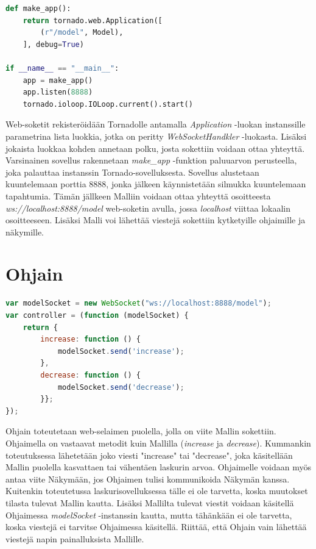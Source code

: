 \documentclass[utf8]{gradu3}
\begin{document}
\begin{lstlisting}[language=Python]
def make_app():
    return tornado.web.Application([
        (r"/model", Model),
    ], debug=True)

if __name__ == "__main__":
    app = make_app()
    app.listen(8888)
    tornado.ioloop.IOLoop.current().start()
\end{lstlisting}

Web-soketit rekisteröidään Tornadolle antamalla \emph{Application} -luokan instanssille parametrina lista luokkia, jotka on peritty \emph{WebSocketHandkler} -luokasta. Lisäksi jokaista luokkaa kohden annetaan polku, josta sokettiin voidaan ottaa yhteyttä. Varsinainen sovellus rakennetaan \emph{make\_app} -funktion paluuarvon perusteella, joka palauttaa instanssin Tornado-sovelluksesta. Sovellus alustetaan kuuntelemaan porttia 8888, jonka jälkeen käynnistetään silmukka kuuntelemaan tapahtumia. Tämän jällkeen Malliin voidaan ottaa yhteyttä osoitteesta \emph{ws://localhost:8888/model} web-soketin avulla, jossa \emph{localhost} viittaa lokaalin osoitteeseen. Lisäksi Malli voi lähettää viestejä sokettiin kytketyille ohjaimille ja näkymille. 


\section{Ohjain}
\begin{lstlisting}[language=Javascript]
var modelSocket = new WebSocket("ws://localhost:8888/model");
var controller = (function (modelSocket) {
    return {
        increase: function () {
            modelSocket.send('increase');
        },
        decrease: function () {
            modelSocket.send('decrease');
        }};
});
\end{lstlisting}

Ohjain toteutetaan web-selaimen puolella, jolla on viite Mallin sokettiin. Ohjaimella on vastaavat metodit kuin Mallilla (\emph{increase} ja \emph{decrease}). Kummankin toteutuksessa lähetetään joko viesti "increase" tai "decrease", joka käsitellään Mallin puolella kasvattaen tai vähentäen laskurin arvoa. Ohjaimelle voidaan myös antaa viite Näkymään, jos Ohjaimen tulisi kommunikoida Näkymän kanssa. Kuitenkin toteutetussa laskurisovelluksessa tälle ei ole tarvetta, koska muutokset tilasta tulevat Mallin kautta. Lisäksi Mallilta tulevat viestit voidaan käsitellä Ohjaimessa \emph{modelSocket} -instanssin kautta, mutta tähänkään ei ole tarvetta, koska viestejä ei tarvitse Ohjaimessa käsitellä. Riittää, että Ohjain vain lähettää viestejä napin painalluksista Mallille.
\end{document}
